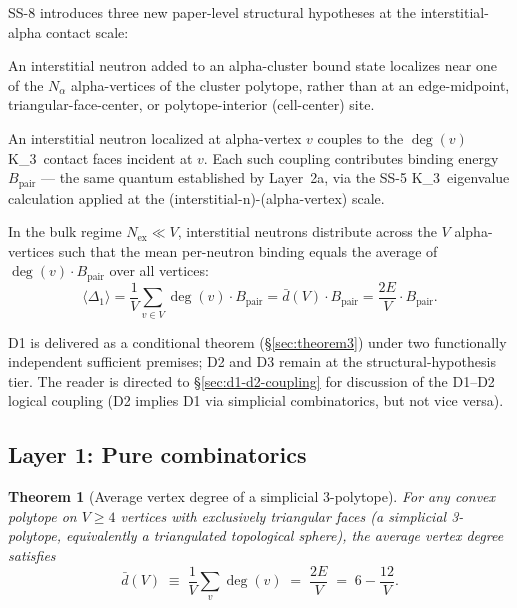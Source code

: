 \documentclass[11pt,letterpaper]{article}
\newtheorem{theorem}{Theorem}[section]
\theoremstyle{definition}
\newcommand{\Bpair}{B_{\text{pair}}}
\newcommand{\Nalpha}{N_\alpha}
\newcommand{\Nex}{N_{\text{ex}}}
\newcommand{\Kthree}{K_3}
\newcommand{\degv}{\deg(v)}
\begin{document}
SS-8 introduces three new paper-level structural hypotheses at the interstitial-alpha contact scale:

\begin{description}[leftmargin=1.2cm,style=nextline]
\item[\textbf{D1} (interstitial-neutron vertex localization)] An interstitial neutron added to an alpha-cluster bound state localizes near one of the $\Nalpha$ alpha-vertices of the cluster polytope, rather than at an edge-midpoint, triangular-face-center, or polytope-interior (cell-center) site.
\item[\textbf{D2} (\Kthree-edge coupling at the host alpha-vertex)] An interstitial neutron localized at alpha-vertex $v$ couples to the $\degv$ \Kthree\ contact faces incident at $v$. Each such coupling contributes binding energy $\Bpair$ --- the same quantum established by Layer~2a, via the SS-5 \Kthree\ eigenvalue calculation applied at the (interstitial-n)-(alpha-vertex) scale.
\item[\textbf{D3} (bulk-regime uniform averaging)] In the bulk regime $\Nex \ll V$, interstitial neutrons distribute across the $V$ alpha-vertices such that the mean per-neutron binding equals the average of $\degv \cdot \Bpair$ over all vertices:
\[
\langle \Delta_1 \rangle = \frac{1}{V} \sum_{v \in V} \degv \cdot \Bpair = \bar{d}(V) \cdot \Bpair = \frac{2E}{V} \cdot \Bpair.
\]
\end{description}

D1 is delivered as a conditional theorem (\S\ref{sec:theorem3}) under two functionally independent sufficient premises; D2 and D3 remain at the structural-hypothesis tier. The reader is directed to \S\ref{sec:d1-d2-coupling} for discussion of the D1--D2 logical coupling (D2 implies D1 via simplicial combinatorics, but not vice versa).

\subsection{Layer 1: Pure combinatorics}
\label{sec:layer1}

\begin{theorem}[Average vertex degree of a simplicial 3-polytope]
\label{thm:euler-degree}
For any convex polytope on $V \geq 4$ vertices with exclusively triangular faces (a simplicial 3-polytope, equivalently a triangulated topological sphere), the average vertex degree satisfies
\begin{equation}
  \bar{d}(V) \;\equiv\; \frac{1}{V} \sum_{v} \degv \;=\; \frac{2E}{V} \;=\; 6 - \frac{12}{V}.
  \label{eq:avg-degree}
\end{equation}
\end{theorem}
\end{document}

